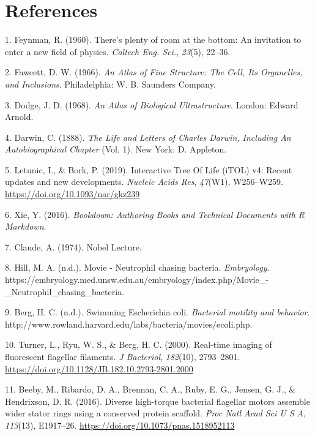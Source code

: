 \documentclass[]{tufte-book}
\begin{document}
\hypertarget{references}{%
\chapter{References}\label{references}}

\hypertarget{refs}{}
\leavevmode\hypertarget{ref-feynman1960}{}%
1. Feynman, R. (1960). There's plenty of room at the bottom: An invitation to enter a new field of physics. \emph{Caltech Eng. Sci.}, \emph{23}(5), 22--36.

\leavevmode\hypertarget{ref-fawcett1966}{}%
2. Fawcett, D. W. (1966). \emph{An Atlas of Fine Structure: The Cell, Its Organelles, and Inclusions}. Philadelphia: W. B. Saunders Company.

\leavevmode\hypertarget{ref-dodge1968}{}%
3. Dodge, J. D. (1968). \emph{An Atlas of Biological Ultrastructure}. London: Edward Arnold.

\leavevmode\hypertarget{ref-darwin1888}{}%
4. Darwin, C. (1888). \emph{The Life and Letters of Charles Darwin, Including An Autobiographical Chapter} (Vol. 1). New York: D. Appleton.

\leavevmode\hypertarget{ref-letunic2019}{}%
5. Letunic, I., \& Bork, P. (2019). Interactive Tree Of Life (iTOL) v4: Recent updates and new developments. \emph{Nucleic Acids Res}, \emph{47}(W1), W256--W259. \url{https://doi.org/10.1093/nar/gkz239}

\leavevmode\hypertarget{ref-xie2016}{}%
6. Xie, Y. (2016). \emph{Bookdown: Authoring Books and Technical Documents with R Markdown}.

\leavevmode\hypertarget{ref-claude1974}{}%
7. Claude, A. (1974). Nobel Lecture.

\leavevmode\hypertarget{ref-hillInternet}{}%
8. Hill, M. A. (n.d.). Movie - Neutrophil chasing bacteria. \emph{Embryology}. https://embryology.med.unsw.edu.au/embryology/index.php/Movie\_-\_Neutrophil\_chasing\_bacteria.

\leavevmode\hypertarget{ref-bergInternet}{}%
9. Berg, H. C. (n.d.). Swimming Escherichia coli. \emph{Bacterial motility and behavior}. http://www.rowland.harvard.edu/labs/bacteria/movies/ecoli.php.

\leavevmode\hypertarget{ref-turner2000}{}%
10. Turner, L., Ryu, W. S., \& Berg, H. C. (2000). Real-time imaging of fluorescent flagellar filaments. \emph{J Bacteriol}, \emph{182}(10), 2793--2801. \url{https://doi.org/10.1128/JB.182.10.2793-2801.2000}

\leavevmode\hypertarget{ref-beeby2016}{}%
11. Beeby, M., Ribardo, D. A., Brennan, C. A., Ruby, E. G., Jensen, G. J., \& Hendrixson, D. R. (2016). Diverse high-torque bacterial flagellar motors assemble wider stator rings using a conserved protein scaffold. \emph{Proc Natl Acad Sci U S A}, \emph{113}(13), E1917--26. \url{https://doi.org/10.1073/pnas.1518952113}
\end{document}

